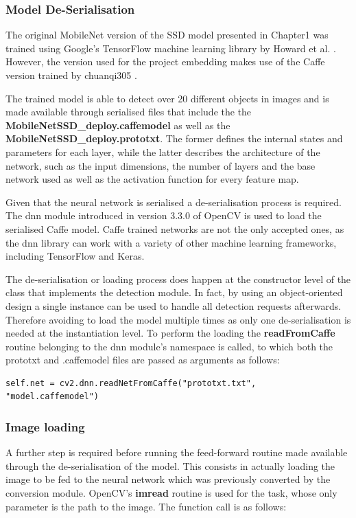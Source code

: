 \subsubsection{Model De-Serialisation}

The original MobileNet version of the SSD model presented in Chapter1 was trained using Google's TensorFlow machine learning library by Howard et al. \cite{paper:MobileNets}. However, the version used for the project embedding makes use of the Caffe version trained by chuanqi305 \cite{website:chuanqi305}.

The trained model is able to detect over 20 different objects in images and is made available through serialised files that include the the \textbf{MobileNetSSD\_deploy.caffemodel} as well as the \textbf{MobileNetSSD\_deploy.prototxt}. The former defines the internal states and parameters for each layer, while the latter describes the architecture of the network, such as the input dimensions, the number of layers and the base network used as well as the activation function for every feature map.

Given that the neural network is serialised a de-serialisation process is required. The dnn module introduced in version 3.3.0 of OpenCV is used to load the serialised Caffe model. Caffe trained networks are not the only accepted ones, as the dnn library can work with a variety of other machine learning frameworks, including TensorFlow and Keras.

The de-serialisation or loading process does happen at the constructor level of the class that implements the detection module. In fact, by using an object-oriented design a single instance can be used to handle all detection requests afterwards. Therefore avoiding to load the model multiple times as only one de-serialisation is needed at the instantiation level. To perform the loading the \textbf{readFromCaffe} routine belonging to the dnn module's namespace is called, to which both the prototxt and .caffemodel files are passed as arguments as follows:

\begin{lstlisting}
self.net = cv2.dnn.readNetFromCaffe("prototxt.txt", "model.caffemodel")
\end{lstlisting}

\subsubsection{Image loading}

A further step is required before running the feed-forward routine made available through the de-serialisation of the model. This consists in actually loading the image to be fed to the neural network which was previously converted by the conversion module. OpenCV's \textbf{imread} routine is used for the task, whose only parameter is the path to the image. The function call is as follows:

